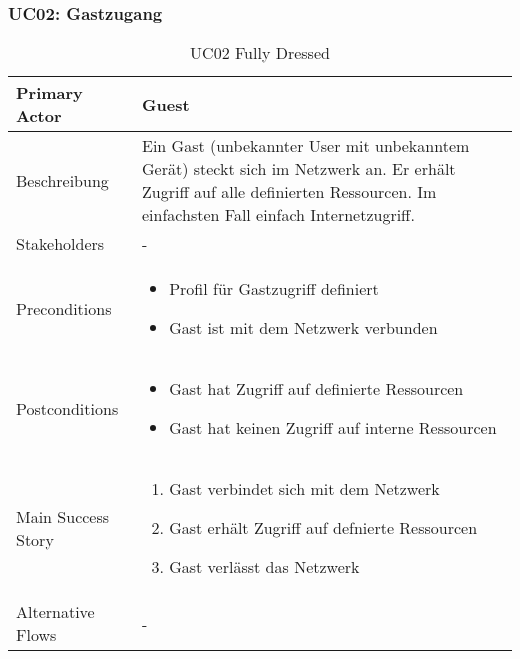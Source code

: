 \subsubsection{UC02: Gastzugang}
\begin{table}[H]
	\centering
	\begin{tabularx}{\textwidth}{l | X}
		Primary Actor   & Guest        \\
		\hline
		Beschreibung   & Ein Gast (unbekannter User mit unbekanntem Gerät) steckt sich im Netzwerk an. Er erhält Zugriff auf alle definierten Ressourcen. Im einfachsten Fall einfach Internetzugriff.  \\ 
		\hline
		Stakeholders       & - \\ 
		Preconditions      &
		\begin{itemize}	
			\item Profil für Gastzugriff definiert
			\item Gast ist mit dem Netzwerk verbunden
		\end{itemize}  \\
		\hline
		Postconditions     & 
		\begin{itemize}	
			\item Gast hat Zugriff auf definierte Ressourcen
			\item Gast hat keinen Zugriff auf interne Ressourcen
		\end{itemize}  \\
		\hline
		Main Success Story & 
		\begin{enumerate}
			\item Gast verbindet sich mit dem Netzwerk
			\item Gast erhält Zugriff auf defnierte Ressourcen
			\item Gast verlässt das Netzwerk
		\end{enumerate}
		\\
		\hline
		Alternative Flows  & -
	\end{tabularx}
	\caption{UC02 Fully Dressed}
	\label{tab:UC02}
\end{table}

